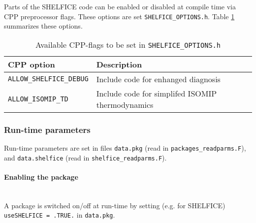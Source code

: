 Parts of the SHELFICE code can be enabled or disabled at compile time
via CPP preprocessor flags. These options are set
\texttt{SHELFICE\_OPTIONS.h}.
Table \ref{tab:pkg:shelfice:cpp} summarizes these options.

\begin{table}[h!]
\centering
  \label{tab:pkg:shelfice:cpp}
  {\footnotesize
    \begin{tabular}{|l|l|}
      \hline 
      \textbf{CPP option}  &  \textbf{Description}  \\
      \hline \hline
        \texttt{ALLOW\_SHELFICE\_DEBUG} & 
          Include code for enhanged diagnosis \\
        \texttt{ALLOW\_ISOMIP\_TD} & 
          Include code for simplifed ISOMIP thermodynamics \\
      \hline
    \end{tabular}
  }
  \caption{Available CPP-flags to be set in \texttt{SHELFICE\_OPTIONS.h}}
\end{table}


\subsubsection{Run-time parameters
\label{sec:pkg:shelfice:runtime}}

Run-time parameters are set in files 
\texttt{data.pkg} (read in \texttt{packages\_readparms.F}),
and \texttt{data.shelfice} (read in \texttt{shelfice\_readparms.F}).

\paragraph{Enabling the package}
~ \\
%
A package is switched on/off at run-time by setting
(e.g. for SHELFICE) \texttt{useSHELFICE = .TRUE.} in \texttt{data.pkg}.

